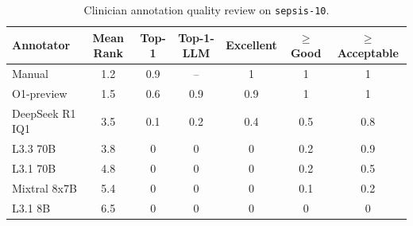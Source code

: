 \begin{table}[htbp]
\caption{Clinician annotation quality review on \texttt{sepsis-10}.}
\ChSixTableBodyStart
\begin{ChSixFloatBody}

\centering
\small


\begin{tabular}{lcccccc}
\toprule
Annotator & Mean Rank & Top-1 & Top-1-LLM & Excellent & $\geq$ Good & $\geq$ Acceptable \\
\midrule
Manual & 1.2 & 0.9 & -- & 1 & 1 & 1 \\
O1-preview & 1.5 & 0.6 & 0.9 & 0.9 & 1 & 1 \\
DeepSeek R1 IQ1 & 3.5 & 0.1 & 0.2 & 0.4 & 0.5 & 0.8 \\
L3.3 70B & 3.8 & 0 & 0 & 0 & 0.2 & 0.9 \\
L3.1 70B & 4.8 & 0 & 0 & 0 & 0.2 & 0.5 \\
Mixtral 8x7B & 5.4 & 0 & 0 & 0 & 0.1 & 0.2 \\
L3.1 8B & 6.5 & 0 & 0 & 0 & 0 & 0 \\
\bottomrule
\end{tabular}

\end{ChSixFloatBody}
\end{table}